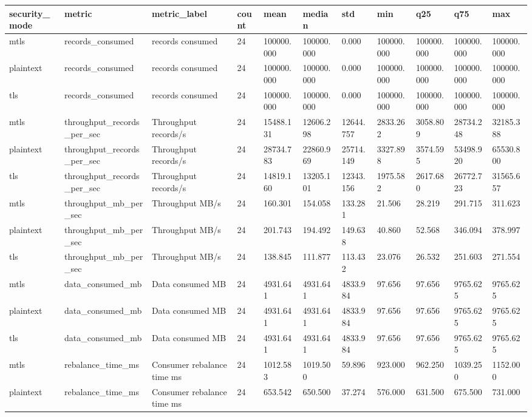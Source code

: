 \begin{longtable}{lllllllllll}
\hline
security\_mode & metric & metric\_label & count & mean & median & std & min & q25 & q75 & max \\
\hline
mtls & records\_consumed & records consumed & 24 & 100000.000 & 100000.000 & 0.000 & 100000.000 & 100000.000 & 100000.000 & 100000.000 \\
plaintext & records\_consumed & records consumed & 24 & 100000.000 & 100000.000 & 0.000 & 100000.000 & 100000.000 & 100000.000 & 100000.000 \\
tls & records\_consumed & records consumed & 24 & 100000.000 & 100000.000 & 0.000 & 100000.000 & 100000.000 & 100000.000 & 100000.000 \\
mtls & throughput\_records\_per\_sec & Throughput records/s & 24 & 15488.131 & 12606.298 & 12644.757 & 2833.262 & 3058.809 & 28734.248 & 32185.388 \\
plaintext & throughput\_records\_per\_sec & Throughput records/s & 24 & 28734.783 & 22860.969 & 25714.149 & 3327.898 & 3574.595 & 53498.920 & 65530.800 \\
tls & throughput\_records\_per\_sec & Throughput records/s & 24 & 14819.160 & 13205.101 & 12343.156 & 1975.582 & 2617.680 & 26772.723 & 31565.657 \\
mtls & throughput\_mb\_per\_sec & Throughput MB/s & 24 & 160.301 & 154.058 & 133.281 & 21.506 & 28.219 & 291.715 & 311.623 \\
plaintext & throughput\_mb\_per\_sec & Throughput MB/s & 24 & 201.743 & 194.492 & 149.638 & 40.860 & 52.568 & 346.094 & 378.997 \\
tls & throughput\_mb\_per\_sec & Throughput MB/s & 24 & 138.845 & 111.877 & 113.432 & 23.076 & 26.532 & 251.603 & 271.554 \\
mtls & data\_consumed\_mb & Data consumed MB & 24 & 4931.641 & 4931.641 & 4833.984 & 97.656 & 97.656 & 9765.625 & 9765.625 \\
plaintext & data\_consumed\_mb & Data consumed MB & 24 & 4931.641 & 4931.641 & 4833.984 & 97.656 & 97.656 & 9765.625 & 9765.625 \\
tls & data\_consumed\_mb & Data consumed MB & 24 & 4931.641 & 4931.641 & 4833.984 & 97.656 & 97.656 & 9765.625 & 9765.625 \\
mtls & rebalance\_time\_ms & Consumer rebalance time ms & 24 & 1012.583 & 1019.500 & 59.896 & 923.000 & 962.250 & 1039.250 & 1152.000 \\
plaintext & rebalance\_time\_ms & Consumer rebalance time ms & 24 & 653.542 & 650.500 & 37.274 & 576.000 & 631.500 & 675.500 & 731.000 \\

\end{longtable}
